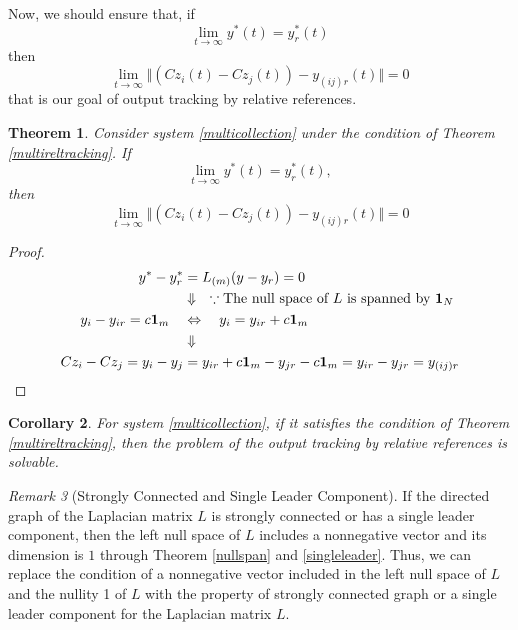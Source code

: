 \documentclass[11pt, a4paper, oneside, openany, reqno]{book}
\newtheorem{theorem}{Theorem}[chapter]
\newtheorem{corollary}[theorem]{Corollary}
\theoremstyle{definition}
\theoremstyle{remark}
\newtheorem{remark}[theorem]{Remark}
\numberwithin{equation}{chapter} %
\newcommand{\ONE}{\textbf{1}}
\begin{document}
Now, we should ensure that, if
\[ \lim_{t \to \infty} y^* (t) = y_{r}^* (t) \]
then 
\[ \lim_{t \to \infty} \Vert ( Cz_i(t) - Cz_j(t)) - y_{(ij)r}(t) \Vert =0 \]
that is our goal of output tracking by relative references.

\begin{theorem}
	Consider system \eqref{multicollection} 
	under the condition of Theorem \ref{multireltracking}. If
	\begin{equation}
		\lim_{t \to \infty} y^* (t) = y_{r}^* (t),
	\end{equation}
	then
	\begin{equation}
		\lim_{t \to \infty} \Vert ( Cz_i(t) - Cz_j(t)) - y_{(ij)r}(t) \Vert =0
	\end{equation}
\end{theorem}

\begin{proof}
	\begin{equation}\begin{split}
	y^* - y_{r}^* &= L_{(m)}(y-y_r)=0 \\
	& \Downarrow \quad \because \text{The null space of $ L $ is spanned by } \ONE_N \\
	y_i-y_{ir} = c \ONE_{m} \quad &\Leftrightarrow \quad y_i = y_{ir}  + c\ONE_{m} \\
	& \Downarrow \\
	Cz_i - Cz_j = y_i -y_j &= y_{ir} +c\ONE_{m} -y_{jr} -c\ONE_{m} =  y_{ir} -y_{jr}  =y_{(ij)r} \\
	\end{split}\end{equation}
\end{proof}


\begin{corollary}\label{corosol}
	For system \eqref{multicollection},
	if it satisfies the condition of Theorem \ref{multireltracking}, then
	the problem of the output tracking by relative references is solvable.
\end{corollary}

\begin{remark}[Strongly Connected and Single Leader Component]\label{scslremark}
	If the directed graph of the Laplacian matrix $ L $ is strongly connected or
	has a single leader component, 
	then the left null space of $ L $ includes  
	a nonnegative vector and its dimension is $ 1 $ 
	through Theorem \ref{nullspan} and \ref{singleleader}.	
	Thus, we can replace 
	the condition of a nonnegative vector included in the left null space of $ L $
	and the nullity 1 of $ L $ with the property of strongly connected graph 
	or a single leader component for the Laplacian matrix $ L $.
\end{remark}
\end{document}
